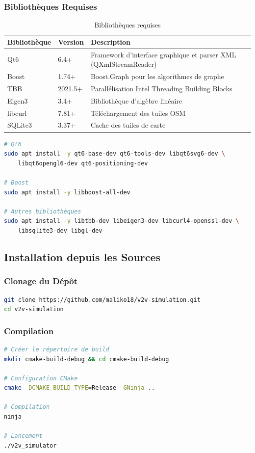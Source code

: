 \documentclass[12pt,a4paper]{article}
\begin{document}
\subsubsection{Bibliothèques Requises}

\begin{table}[H]
\centering
\begin{tabular}{llp{7cm}}
\toprule
\textbf{Bibliothèque} & \textbf{Version} & \textbf{Description} \\
\midrule
Qt6 & 6.4+ & Framework d'interface graphique et parser XML (QXmlStreamReader) \\
Boost & 1.74+ & Boost.Graph pour les algorithmes de graphe \\
TBB & 2021.5+ & Parallélisation Intel Threading Building Blocks \\
Eigen3 & 3.4+ & Bibliothèque d'algèbre linéaire \\
libcurl & 7.81+ & Téléchargement des tuiles OSM \\
SQLite3 & 3.37+ & Cache des tuiles de carte \\
\bottomrule
\end{tabular}
\caption{Bibliothèques requises}
\end{table}

\begin{lstlisting}[language=bash, caption={Installation des dépendances}]
# Qt6
sudo apt install -y qt6-base-dev qt6-tools-dev libqt6svg6-dev \
    libqt6opengl6-dev qt6-positioning-dev

# Boost
sudo apt install -y libboost-all-dev

# Autres bibliothèques
sudo apt install -y libtbb-dev libeigen3-dev libcurl4-openssl-dev \
    libsqlite3-dev libgl-dev
\end{lstlisting}

\subsection{Installation depuis les Sources}

\subsubsection{Clonage du Dépôt}
\begin{lstlisting}[language=bash]
git clone https://github.com/maliko18/v2v-simulation.git
cd v2v-simulation
\end{lstlisting}

\subsubsection{Compilation}
\begin{lstlisting}[language=bash]
# Créer le répertoire de build
mkdir cmake-build-debug && cd cmake-build-debug

# Configuration CMake
cmake -DCMAKE_BUILD_TYPE=Release -GNinja ..

# Compilation
ninja

# Lancement
./v2v_simulator
\end{lstlisting}
\end{document}
